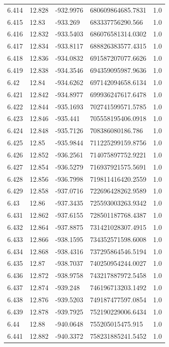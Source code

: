 \begin{tabular}{lllll}
6.414 & 12.828 & -932.9976 & 680609864685.7831 & 1.0 \\
6.415 & 12.83 & -933.269 & 683337756290.566 & 1.0 \\
6.416 & 12.832 & -933.5403 & 686076581314.0302 & 1.0 \\
6.417 & 12.834 & -933.8117 & 688826383577.4315 & 1.0 \\
6.418 & 12.836 & -934.0832 & 691587207077.6626 & 1.0 \\
6.419 & 12.838 & -934.3546 & 694359095987.9636 & 1.0 \\
6.42 & 12.84 & -934.6262 & 697142094658.6134 & 1.0 \\
6.421 & 12.842 & -934.8977 & 699936247617.6478 & 1.0 \\
6.422 & 12.844 & -935.1693 & 702741599571.5785 & 1.0 \\
6.423 & 12.846 & -935.441 & 705558195406.0918 & 1.0 \\
6.424 & 12.848 & -935.7126 & 708386080186.786 & 1.0 \\
6.425 & 12.85 & -935.9844 & 711225299159.8756 & 1.0 \\
6.426 & 12.852 & -936.2561 & 714075897752.9221 & 1.0 \\
6.427 & 12.854 & -936.5279 & 716937921575.5691 & 1.0 \\
6.428 & 12.856 & -936.7998 & 719811416420.2559 & 1.0 \\
6.429 & 12.858 & -937.0716 & 722696428262.9589 & 1.0 \\
6.43 & 12.86 & -937.3435 & 725593003263.9342 & 1.0 \\
6.431 & 12.862 & -937.6155 & 728501187768.4387 & 1.0 \\
6.432 & 12.864 & -937.8875 & 731421028307.4915 & 1.0 \\
6.433 & 12.866 & -938.1595 & 734352571598.6008 & 1.0 \\
6.434 & 12.868 & -938.4316 & 737295864546.5194 & 1.0 \\
6.435 & 12.87 & -938.7037 & 740250954244.0027 & 1.0 \\
6.436 & 12.872 & -938.9758 & 743217887972.5458 & 1.0 \\
6.437 & 12.874 & -939.248 & 746196713203.1492 & 1.0 \\
6.438 & 12.876 & -939.5203 & 749187477597.0854 & 1.0 \\
6.439 & 12.878 & -939.7925 & 752190229006.6434 & 1.0 \\
6.44 & 12.88 & -940.0648 & 755205015475.915 & 1.0 \\
6.441 & 12.882 & -940.3372 & 758231885241.5452 & 1.0 \\

\end{tabular}
